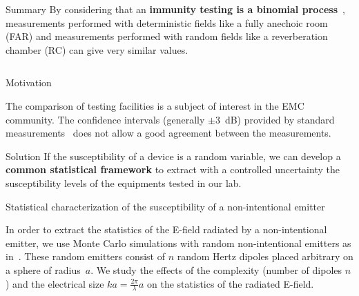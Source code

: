 \documentclass[final,hyperref={pdfpagelabels=false}]{beamer}
\begin{document}
\begin{frame}{}

      \begin{block}{\huge{Summary}}
      \LARGE{By considering that an \textbf{immunity testing is a binomial process}~\cite{Amador13}, measurements performed with deterministic fields like a fully anechoic room (FAR) and measurements performed with random fields like a reverberation chamber (RC) can give very similar values.}  
      \end{block}
  \begin{columns}[t]
% 
    \begin{column}{0.32\linewidth}

	\vspace{-1cm}
      \begin{block}{Motivation}  \justifying
       \large{The comparison of testing facilities is a subject of interest in the EMC community.
	 The confidence intervals (generally $\pm 3$~dB) provided by standard measurements~\cite{IEC21,IEC22} does not allow a good agreement between the measurements.

      }
\end{block}
\begin{center}\begin{minipage}{0.9\textwidth}
	\begin{exampleblock}{{Solution}} \justifying
  \large{If the susceptibility of a device is a random variable, we can develop a \textbf{common statistical framework} to extract with a controlled uncertainty the susceptibility levels of the equipments tested in our lab. }
	\end{exampleblock}
\end{minipage}\end{center}
      \begin{block}{{Statistical characterization of the susceptibility of a non-intentional emitter}} \justifying
        \large{ In order to extract the statistics of the E-field radiated by a non-intentional emitter, we use Monte Carlo simulations with random non-intentional emitters as in~\cite{Wilson02}. These random emitters consist of $n$ random Hertz dipoles placed arbitrary on a sphere of radius~$a$.
We study the effects of the complexity (number of dipoles $n$) and the electrical size $ka=\frac{2\pi}{\lambda}a$ on the statistics of the radiated E-field.

}
\end{block}
\end{column}
\end{columns}
\end{frame}
\end{document}
